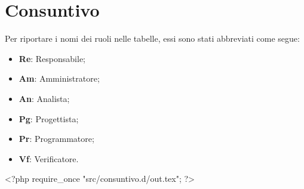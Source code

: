 \nonstopmode
\pagebreak

\section{Consuntivo}

Per riportare i nomi dei ruoli nelle tabelle, essi sono stati abbreviati come segue:

\begin{itemize}
\item \textbf{Re}: Responsabile;
\item \textbf{Am}: Amministratore;
\item \textbf{An}: Analista;
\item \textbf{Pg}: Progettista;
\item \textbf{Pr}: Programmatore;
\item \textbf{Vf}: Verificatore.
\end{itemize}

<?php require_once "src/consuntivo.d/out.tex"; ?>

